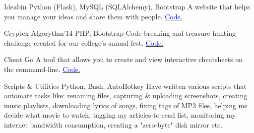     {Ideabin}
    {}
    {\scriptsize Python (Flask), MySQL (SQLAlchemy), Bootstrap}
    {}
    {
        A website that helps you manage your ideas and share them with people.
        \hfill
        \href{http://github.com/ideabin/ideabin/}{\textcolor{blue}{\scriptsize Code.}}
    }
    \vspace*{0.2\baselineskip}

    {Cryptex}
    {Algorythm'14}
    {\scriptsize PHP, Bootstrap}
    {}
    {
        Code breaking and treasure hunting challenge created for our college's annual fest.
        \hfill
        \href{http://github.com/jdevlabs/cryptex/}{\textcolor{blue}{\scriptsize Code.}}
    }
    \vspace*{0.2\baselineskip}

\cventry{}
    {Cheat}
    {}
    {\scriptsize Go}
    {}
    {
        A tool that allows you to create and view interactive cheatsheets on the command-line.
        \hfill
        \href{http://github.com/dufferzafar/cheat/}{\textcolor{blue}{\scriptsize Code.}}
    }
    \vspace*{0.2\baselineskip}

\cventry{}
    {Scripts \& Utilities}
    {}
    {\scriptsize Python, Bash, AutoHotkey}
    {}
    {
        Have written various scripts that automate tasks like:
        renaming files,
        capturing \& uploading screenshots,
        creating music playlists,
        downloading lyrics of songs,
        fixing tags of MP3 files,
        helping me decide what movie to watch,
        tagging my articles-to-read list,
        monitoring my internet bandwidth consumption,
        creating a "zero-byte" disk mirror etc.
    }
    \vspace*{0.2\baselineskip}
